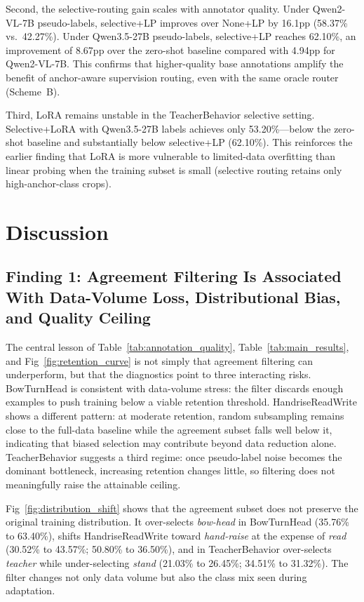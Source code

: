 \documentclass{ieeeaccess}
\begin{document}
Second, the selective-routing gain scales with annotator quality.
Under Qwen2-VL-7B pseudo-labels, selective+LP improves over None+LP
by 16.1pp (58.37\% vs.\ 42.27\%).
Under Qwen3.5-27B pseudo-labels, selective+LP reaches 62.10\%, an
improvement of 8.67pp over the zero-shot baseline compared with 4.94pp
for Qwen2-VL-7B.
This confirms that higher-quality base annotations amplify the benefit
of anchor-aware supervision routing, even with the same oracle router
(Scheme~B).

Third, LoRA remains unstable in the TeacherBehavior selective setting.
Selective+LoRA with Qwen3.5-27B labels achieves only 53.20\%---below
the zero-shot baseline and substantially below selective+LP (62.10\%).
This reinforces the earlier finding that LoRA is more vulnerable to
limited-data overfitting than linear probing when the training subset
is small (selective routing retains only high-anchor-class crops).

\section{Discussion}
\label{sec:discussion}

\subsection{Finding 1: Agreement Filtering Is Associated With
Data-Volume Loss, Distributional Bias, and Quality Ceiling}

The central lesson of Table~\ref{tab:annotation_quality},
Table~\ref{tab:main_results}, and Fig~\ref{fig:retention_curve} is not
simply that agreement filtering can underperform, but that the
diagnostics point to three interacting risks.
BowTurnHead is consistent with data-volume stress: the filter discards
enough examples to push training below a viable retention threshold.
HandriseReadWrite shows a different pattern: at moderate retention,
random subsampling remains close to the full-data baseline while the
agreement subset falls well below it, indicating that biased selection
may contribute beyond data reduction alone.
TeacherBehavior suggests a third regime: once pseudo-label noise becomes
the dominant bottleneck, increasing retention changes little, so
filtering does not meaningfully raise the attainable ceiling.

Fig~\ref{fig:distribution_shift} shows that the agreement subset does
not preserve the original training distribution. It over-selects
\textit{bow-head} in BowTurnHead (35.76\% to 63.40\%), shifts
HandriseReadWrite toward \textit{hand-raise} at the expense of
\textit{read} (30.52\% to 43.57\%; 50.80\% to 36.50\%), and in
TeacherBehavior over-selects \textit{teacher} while under-selecting
\textit{stand} (21.03\% to 26.45\%; 34.51\% to 31.32\%). The filter
changes not only data volume but also the class mix seen
during adaptation.
\end{document}
